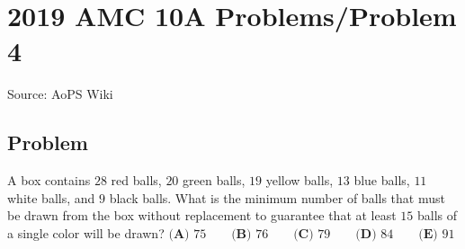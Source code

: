\documentclass[12pt]{article}
\begin{document}
\section*{{2019 AMC 10A Problems/Problem 4}}
Source: AoPS Wiki

\subsection*{Problem}
A box contains $28$ red balls, $20$ green balls, $19$ yellow balls, $13$ blue balls, $11$ white balls, and $9$ black balls. What is the minimum number of balls that must be drawn from the box without replacement to guarantee that at least $15$ balls of a single color will be drawn? $\textbf{(A) } 75 \qquad\textbf{(B) } 76 \qquad\textbf{(C) } 79 \qquad\textbf{(D) } 84 \qquad\textbf{(E) } 91$
\end{document}
